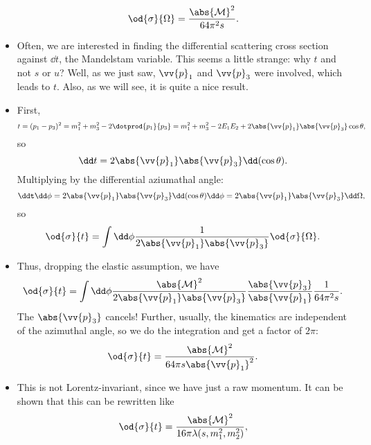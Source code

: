 \begin{itemize}
\begin{equation}
            \od{\sigma}{\Omega} = \frac{\abs{\mathcal{M}}^2}{64\pi^2 s}.
        \end{equation}
    \item Often, we are interested in finding the differential scattering cross section against $\dd t$, the Mandelstam variable. This seems a little strange: why $t$ and not $s$ or $u$? Well, as we just saw, $\vv{p}_1$ and $\vv{p}_3$ were involved, which leads to $t$. Also, as we will see, it is quite a nice result.
    \item First, 
        \begin{equation*}
            t = (p_1 - p_3)^2 = m_1^2 + m_3^2 - 2\dotprod{p_1}{p_3} = m_1^2 + m_3^2 - 2E_1E_2 + 2\abs{\vv{p}_1}\abs{\vv{p}_3}\cos\theta,
        \end{equation*}
        so
        \begin{equation*}
            \dd t = 2\abs{\vv{p}_1}\abs{\vv{p}_3}\dd(\cos\theta).
        \end{equation*}
        Multiplying by the differential aziumathal angle:
        \begin{equation*}
            \ddt \dd\phi = 2\abs{\vv{p}_1}\abs{\vv{p}_3}\dd(\cos\theta)\dd\phi = 2\abs{\vv{p}_1}\abs{\vv{p}_3}\dd\Omega,
        \end{equation*}
        so
        \begin{equation*}
            \od{\sigma}{t} = \int\dd\phi \frac{1}{2\abs{\vv{p}_1}\abs{\vv{p}_3}} \od{\sigma}{\Omega}.
        \end{equation*}
    \item Thus, dropping the elastic assumption, we have
        \begin{equation*}
            \od{\sigma}{t} = \int\dd\phi \frac{\abs{\mathcal{M}}^2}{2\abs{\vv{p}_1}\abs{\vv{p}_3}} \frac{\abs{\vv{p}_3}}{\abs{\vv{p}_1}} \frac{1}{64\pi^2 s}.
        \end{equation*}
        The $\abs{\vv{p}_3}$ cancels! Further, usually, the kinematics are independent of the azimuthal angle, so we do the integration and get a factor of $2\pi$:
        \begin{equation}
            \od{\sigma}{t} = \frac{\abs{\mathcal{M}}^2}{64\pi s \abs{\vv{p}_1}^2}.
        \end{equation}
    \item This is not Lorentz-invariant, since we have just a raw momentum. It can be shown that this can be rewritten like
        \begin{equation*}
            \od{\sigma}{t} = \frac{\abs{\mathcal{M}}^2}{16\pi \lambda(s,m_1^2,m_2^2)},

\end{equation*}
\end{itemize}
